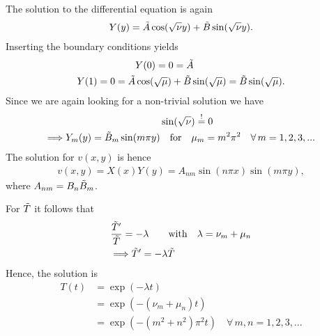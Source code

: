 \documentclass{article}
\begin{document}
The solution to the differential equation is again
\begin{align}
    Y(y) = \Tilde{A} \cos(\sqrt{\nu}y) + \Tilde{B}\sin(\sqrt{\nu}y).
\end{align}
Inserting the boundary conditions yields
\begin{align}
    &Y(0) = 0 = \Tilde{A} \\
    Y(1) = 0 = \Tilde{A} &\cos(\sqrt{\mu}) + \Tilde{B}\sin(\sqrt{\mu}) = \Tilde{B}\sin(\sqrt{\mu}).
\end{align}
Since we are again looking for a non-trivial solution we have
\begin{align}
    &\sin(\sqrt{\nu}) \overset{!}{=} 0 \\
    \Longrightarrow Y_m(y) = \Tilde{B}_m \sin(m\pi  y)& \quad {\rm for} \quad \mu_m = m^2\pi^2 \quad \forall \,m = 1, 2, 3, ...
\end{align}
The solution for $v(x,y)$ is hence
\begin{align}
    v(x,y) = X(x)Y(y) = A_{nm} \sin(n\pi  x) \sin(m\pi  y),
\end{align}
where $A_{nm} = B_n \Tilde{B}_m$.

For $\Tilde{T}$ it follows that
\begin{align}
    &\frac{\Tilde{T}'}{\Tilde{T}} = -\lambda \quad \quad {\rm with} \quad \lambda = \nu_m + \mu_n \\
    &\Longrightarrow \Tilde{T}' = -\lambda \Tilde{T}
\end{align}
Hence, the solution is
\begin{align}
    T(t) &= \exp(-\lambda t) \\
    &=\exp(-(\nu_m + \mu_n)t) \\
    &= \exp(-(m^2+ n^2)\pi^2t) \quad \forall \,m,n = 1, 2, 3, ...
\end{align}
\end{document}
